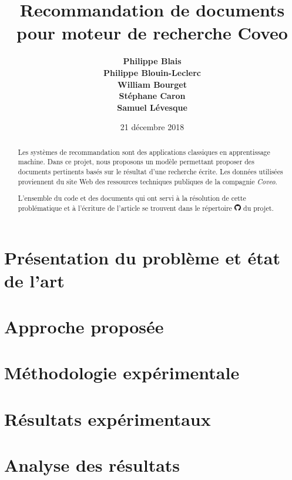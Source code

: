 \documentclass[10pt,letterpaper]{article}
\title{Recommandation de documents pour moteur de recherche Coveo}
\author{{\large \bf Philippe Blais} \\
   {\large \bf Philippe Blouin-Leclerc} \\
   {\large \bf William Bourget} \\
   {\large \bf Stéphane Caron} \\
   {\large \bf Samuel Lévesque}}
\date{21 décembre 2018}
\numberwithin{equation}{section}
\begin{document}
\maketitle

\begin{multicols}{2}

\begin{abstract}
Les systèmes de recommandation sont des applications classiques en apprentissage machine. Dans ce projet, nous proposons un modèle permettant proposer des documents pertinents basés sur le résultat d'une recherche écrite. Les données utilisées proviennent du site Web des ressources techniques publiques de la compagnie \textit{Coveo}.

L'ensemble du code et des documents qui ont servi à la résolution de cette problématique et à l'écriture de l'article se trouvent dans le répertoire \href{https://github.com/stecaron/projet-gif-7005}{\includegraphics[height=0.3cm]{GitHub-Mark-32px}} du projet.
\end{abstract}


\section{Présentation du problème et état de l'art}




\section{Approche proposée}




\section{Méthodologie expérimentale}




\section{Résultats expérimentaux}




\section{Analyse des résultats}


\end{multicols}
\end{document}

